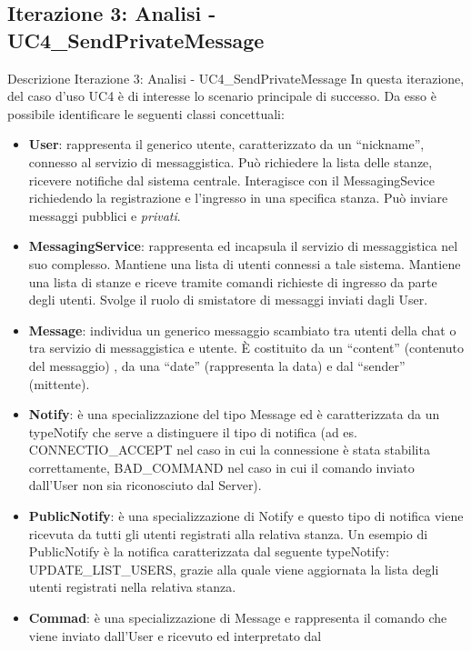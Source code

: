 \subsection {Iterazione 3: Analisi - UC4\_SendPrivateMessage}
\begin{frame} [allowframebreaks] {Descrizione Iterazione 3: Analisi - UC4\_SendPrivateMessage}
  In questa iterazione, del caso d’uso UC4 è di interesse lo scenario principale di successo.  Da esso è possibile identificare le seguenti classi concettuali: 
  \begin{itemize}
   \item \textbf{User}: rappresenta il generico utente, caratterizzato da un ``nickname'', connesso al servizio di messaggistica. Può richiedere la lista delle 
         stanze, ricevere notifiche dal sistema centrale. Interagisce con il MessagingSevice richiedendo la registrazione e l’ingresso in una specifica stanza. 
         Può inviare messaggi pubblici e \textit{privati}.
   \item \textbf{MessagingService}: rappresenta ed incapsula il servizio di messaggistica nel suo complesso. Mantiene una lista di utenti connessi a tale sistema. 
          Mantiene una lista di stanze e riceve tramite comandi richieste di ingresso da parte degli utenti. Svolge il ruolo di smistatore di messaggi inviati dagli 
          User.
   \item \textbf{Message}: individua un generico messaggio scambiato tra utenti della chat o tra servizio di messaggistica e utente. È costituito da un 
         ``content'' (contenuto del messaggio) , da una ``date'' (rappresenta la data) e dal ``sender'' (mittente).
   \item \textbf{Notify}: è una specializzazione del tipo Message ed è caratterizzata da un typeNotify che serve a distinguere il tipo di notifica (ad es. 
          CONNECTIO\_ACCEPT nel caso in cui la connessione è stata stabilita correttamente, BAD\_COMMAND nel caso in cui il comando inviato dall'User non 
          sia riconosciuto dal Server).
   \item \textbf{PublicNotify}: è una specializzazione di Notify e questo tipo di notifica viene ricevuta da tutti gli utenti registrati alla relativa 
          stanza. Un esempio di PublicNotify è la notifica caratterizzata dal seguente typeNotify: UPDATE\_LIST\_USERS, grazie alla quale viene 
          aggiornata la lista degli utenti registrati nella relativa stanza.
   \item  \textbf{Commad}: è una specializzazione di Message e rappresenta il comando che viene inviato dall'User e ricevuto ed interpretato dal            

\end{itemize}
\end{frame}
